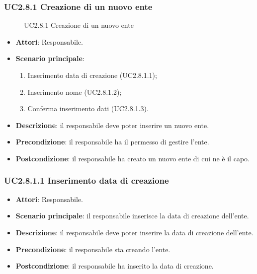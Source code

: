 \subsubsection{UC2.8.1 Creazione di un nuovo ente}
\begin{figure}[H]
\centering
\noindent{}
\caption{UC2.8.1 Creazione di un nuovo ente}
\end{figure}
\begin{itemize}
\item \textbf{Attori}: Responsabile.
\item \textbf{Scenario principale}:
\begin{enumerate}
\item Inserimento data di creazione (UC2.8.1.1);
\item Inserimento nome (UC2.8.1.2);
\item Conferma inserimento dati (UC2.8.1.3).
\end{enumerate}
\item \textbf{Descrizione}: il responsabile deve poter inserire un nuovo ente.
\item \textbf{Precondizione}: il responsabile ha il permesso di gestire l’ente.
\item \textbf{Postcondizione}: il responsabile ha creato un nuovo ente di cui ne è il capo.
\end{itemize}
\subsubsection{UC2.8.1.1 Inserimento data di creazione}
\begin{itemize}
\item \textbf{Attori}: Responsabile.
\item \textbf{Scenario principale}: il responsabile inserisce la data di creazione dell'ente.
\item \textbf{Descrizione}: il responsabile deve poter inserire la data di creazione dell'ente.
\item \textbf{Precondizione}: il responsabile sta creando l'ente.
\item \textbf{Postcondizione}: il responsabile ha inserito la data di creazione.
\end{itemize}
